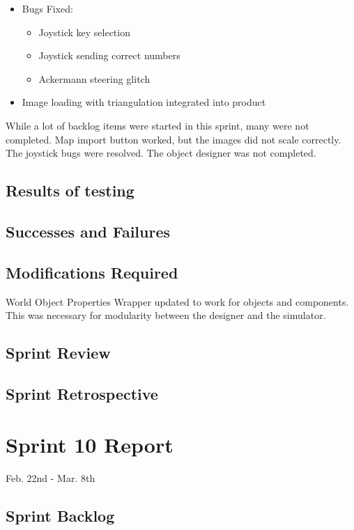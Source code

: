 \begin{itemize}
	\item Bugs Fixed:	
	\begin{itemize}
		\item Joystick key selection
		\item Joystick sending correct numbers
		\item Ackermann steering glitch
	\end{itemize}
	\item Image loading with triangulation integrated into product
\end{itemize}


While a lot of backlog items were started in this sprint, many were not completed. Map import button worked, but the images did not scale correctly. The joystick bugs were resolved. The object designer was not completed.

\subsection{Results of testing}


\subsection{Successes and Failures}


\subsection{Modifications Required}

World Object Properties Wrapper updated to work for objects and components. This was necessary for modularity between the designer and the simulator.

\subsection{Sprint Review}


\subsection{Sprint Retrospective}

\section{Sprint 10 Report}
Feb. 22nd - Mar. 8th
\subsection{Sprint Backlog}

